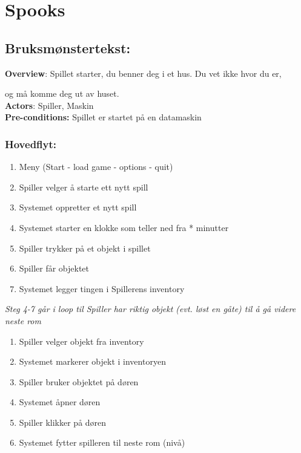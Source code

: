 \documentclass[12pt]{report}
\begin{document}
\section*{Spooks}

\subsection*{Bruksm{\o}nstertekst:}

\textbf{Overview}: Spillet starter, du benner deg i et hus. Du vet ikke hvor du er,

og m{\aa} komme deg ut av huset. \\

\textbf{Actors}: Spiller, Maskin \\

\textbf{Pre-conditions:} Spillet er startet p{\aa} en datamaskin \\

\subsubsection*{Hovedflyt:}

\begin{enumerate}
\item Meny (Start - load game - options - quit)
\item Spiller velger {\aa} starte ett nytt spill
\item Systemet oppretter et nytt spill
\item Systemet starter en klokke som teller ned fra * minutter
\item Spiller trykker p{\aa} et objekt i spillet
\item Spiller f{\aa}r objektet
\item Systemet legger tingen i Spillerens inventory
\end{enumerate}

\textit{Steg 4-7 g{\aa}r i loop til Spiller har riktig objekt (evt. l{\o}st en g{\aa}te) til {\aa} g{\aa} videre neste
rom}

\begin{enumerate}[resume]
\item Spiller velger objekt fra inventory
\item Systemet markerer objekt i inventoryen
\item Spiller bruker objektet p{\aa} d{\o}ren
\item Systemet {\aa}pner d{\o}ren
\item Spiller klikker p{\aa} d{\o}ren
\item Systemet fytter spilleren til neste rom (niv{\aa})
\end{enumerate}
\end{document}
